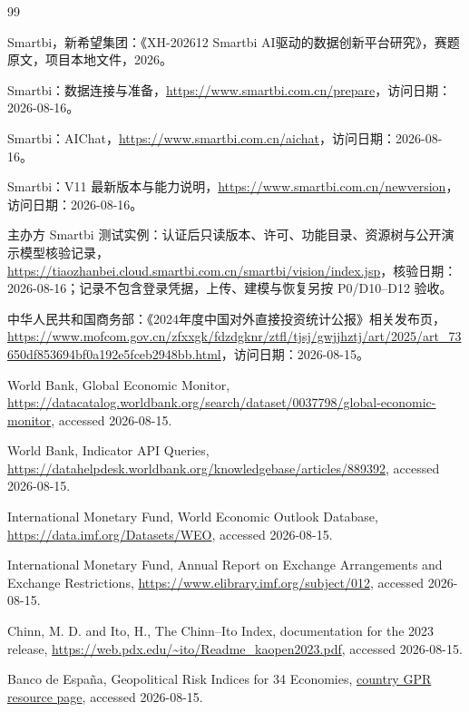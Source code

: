 \documentclass[UTF8,fontset=windows,12pt,openany]{ctexbook}
\begin{document}
\begin{thebibliography}{99}

Smartbi，新希望集团：《XH-202612 Smartbi AI驱动的数据创新平台研究》，赛题原文，项目本地文件，2026。

Smartbi：数据连接与准备，\url{https://www.smartbi.com.cn/prepare}，访问日期：2026-08-16。

Smartbi：AIChat，\url{https://www.smartbi.com.cn/aichat}，访问日期：2026-08-16。

Smartbi：V11 最新版本与能力说明，\url{https://www.smartbi.com.cn/newversion}，访问日期：2026-08-16。

主办方 Smartbi 测试实例：认证后只读版本、许可、功能目录、资源树与公开演示模型核验记录，\url{https://tiaozhanbei.cloud.smartbi.com.cn/smartbi/vision/index.jsp}，核验日期：2026-08-16；记录不包含登录凭据，上传、建模与恢复另按 P0/D10--D12 验收。

中华人民共和国商务部：《2024年度中国对外直接投资统计公报》相关发布页，\url{https://www.mofcom.gov.cn/zfxxgk/fdzdgknr/ztfl/tjsj/gwjjhztj/art/2025/art_73650df853694bf0a192e5fceb2948bb.html}，访问日期：2026-08-15。

World Bank, Global Economic Monitor, \url{https://datacatalog.worldbank.org/search/dataset/0037798/global-economic-monitor}, accessed 2026-08-15.

World Bank, Indicator API Queries, \url{https://datahelpdesk.worldbank.org/knowledgebase/articles/889392}, accessed 2026-08-15.

International Monetary Fund, World Economic Outlook Database, \url{https://data.imf.org/Datasets/WEO}, accessed 2026-08-15.

International Monetary Fund, Annual Report on Exchange Arrangements and Exchange Restrictions, \url{https://www.elibrary.imf.org/subject/012}, accessed 2026-08-15.

Chinn, M. D. and Ito, H., The Chinn--Ito Index, documentation for the 2023 release, \url{https://web.pdx.edu/~ito/Readme_kaopen2023.pdf}, accessed 2026-08-15.

Banco de España, Geopolitical Risk Indices for 34 Economies, \href{https://www.bde.es/wbe/en/areas-actuacion/analisis-e-investigacion/recursos/indices-de-riesgo-geopolitico-generales-y-bilaterales-para-34-economias-6075d2451c9da91.html}{country GPR resource page}, accessed 2026-08-15.


\end{thebibliography}
\end{document}
